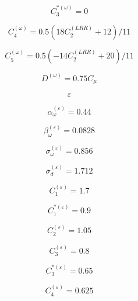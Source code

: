 \begin{equation}
C_3^{*(\omega)} = 0
\end{equation}

\begin{equation}
C_4^{(\omega)} = 0.5 (18 C_2^{(LRR)} + 12) / 11
\end{equation}

\begin{equation}
C_5^{(\omega)} = 0.5 (-14 C_2^{(LRR)} + 20)/11
\end{equation}

\begin{equation}
D^{(\omega)} = 0.75 C_{\mu}
\end{equation}

\begin{equation}
\varepsilon
\end{equation}

\begin{equation}
\alpha_{\omega}^{(\varepsilon)} = 0.44
\end{equation}

\begin{equation}
\beta_{\omega}^{(\varepsilon)} = 0.0828
\end{equation}

\begin{equation}
\sigma_{\omega}^{(\varepsilon)} = 0.856
\end{equation}

\begin{equation}
\sigma_d^{(\varepsilon)} = 1.712
\end{equation}

\begin{equation}
C_1^{(\varepsilon)} = 1.7
\end{equation}

\begin{equation}
C_1^{*(\varepsilon)} = 0.9
\end{equation}

\begin{equation}
C_2^{(\varepsilon)} = 1.05
\end{equation}

\begin{equation}
C_3^{(\varepsilon)} = 0.8
\end{equation}

\begin{equation}
C_3^{*(\varepsilon)} = 0.65
\end{equation}

\begin{equation}
C_4^{(\varepsilon)} = 0.625
\end{equation}

